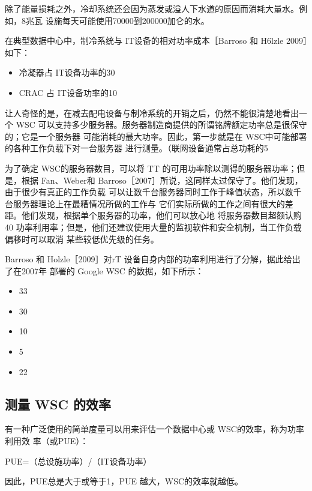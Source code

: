 除了能量损耗之外，冷却系统还会因为蒸发或溢人下水道的原因而消耗大量水。例如，8兆瓦
设施每天可能使用70000到200000加仑的水。

在典型数据中心中，制冷系统与 IT设备的相对功率成本［Barroso 和 H6lzle 2009］如下：

\begin{itemize}
    \item 冷凝器占 IT设备功率的30%
    \item CRAC 占 IT设备功率的10%
\end{itemize}

让人奇怪的是，在减去配电设备与制冷系统的开销之后，仍然不能很清楚地看出一个 WSC
可以支持多少服务器。服务器制造商提供的所谓铭牌额定功率总是很保守的；它是一个服务器
可能消耗的最大功率。因此，第一步就是在 WSC中可能部署的各种工作负载下对一台服务器
进行测量。（联网设备通常占总功耗的5%

为了确定 WSC的服务器数目，可以将 TT 的可用功率除以测得的服务器功率；但是，根据
Fan、Weber和 Barroso［2007］所说，这同样太过保守了。他们发现，由于很少有真正的工作负载
可以让数千台服务器同时工作于峰值状态，所以数千台服务器理论上在最糟情况所做的工作与
它们实际所做的工作之间有很大的差距。他们发现，根据单个服务器的功率，他们可以放心地
将服务器数目超额认购40%
功率利用率；但是，他们还建议使用大量的监视软件和安全机制，当工作负载偏移时可以取消
某些较低优先级的任务。

Barroso 和 Holzle［2009］对rT 设备自身内部的功率利用进行了分解，据此给出了在2007年
部署的 Google WSC 的数据，如下所示：

\begin{itemize}
    \item 33%
    \item 30%
    \item 10%
    \item 5%
    \item 22%
\end{itemize}
\subsection{测量 WSC 的效率}
有一种广泛使用的简单度量可以用来评估一个数据中心或 WSC的效率，称为功率利用效
率（或PUE）：

PUE=（总设施功率）/（IT设备功率）

因此，PUE总是大于或等于1，PUE 越大，WSC的效率就越低。

